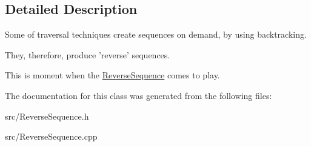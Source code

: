 \subsection{Detailed Description}
Some of traversal techniques create sequences on demand, by using backtracking. 

They, therefore, produce 'reverse' sequences.

This is moment when the \hyperlink{classBrutha_1_1ReverseSequence}{ReverseSequence} comes to play. 

The documentation for this class was generated from the following files:\begin{CompactItemize}
\item 
src/ReverseSequence.h\item 
src/ReverseSequence.cpp\end{CompactItemize}
